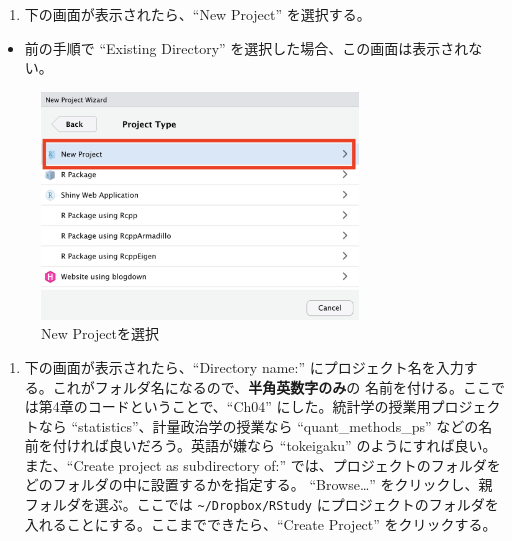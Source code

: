 \documentclass[
  a4paper,
  pandoc,
  ja=standard,
  jafont=haranoaji]{bxjsbook}
\providecommand{\tightlist}{%
  \setlength{\itemsep}{0pt}\setlength{\parskip}{0pt}}
\begin{document}
\begin{enumerate}
\def\labelenumi{\arabic{enumi}.}
\setcounter{enumi}{3}
\tightlist
\item
  下の画面が表示されたら、``New Project'' を選択する。
\end{enumerate}

\begin{itemize}
\tightlist
\item
  前の手順で ``Existing Directory''
  を選択した場合、この画面は表示されない。
\end{itemize}

\begin{figure}

{\centering \includegraphics[width=0.75\textwidth,height=\textheight]{./Figs/Rbasic/Project3.png}

}

\caption{\label{fig-rbasic_project3}New Projectを選択}

\end{figure}

\begin{enumerate}
\def\labelenumi{\arabic{enumi}.}
\setcounter{enumi}{4}
\tightlist
\item
  下の画面が表示されたら、``Directory name:''
  にプロジェクト名を入力する。これがフォルダ名になるので、\textbf{半角英数字のみ}の
  名前を付ける。ここでは第4章のコードということで、``Ch04''
  にした。統計学の授業用プロジェクトなら
  ``statistics''、計量政治学の授業なら ``quant\_methods\_ps''
  などの名前を付ければ良いだろう。英語が嫌なら ``tokeigaku''
  のようにすれば良い。また、``Create project as subdirectory of:''
  では、プロジェクトのフォルダをどのフォルダの中に設置するかを指定する。
  ``Browse\ldots{}'' をクリックし、親フォルダを選ぶ。ここでは
  \texttt{\textasciitilde{}/Dropbox/RStudy}
  にプロジェクトのフォルダを入れることにする。ここまでできたら、``Create
  Project'' をクリックする。
\end{enumerate}
\end{document}
